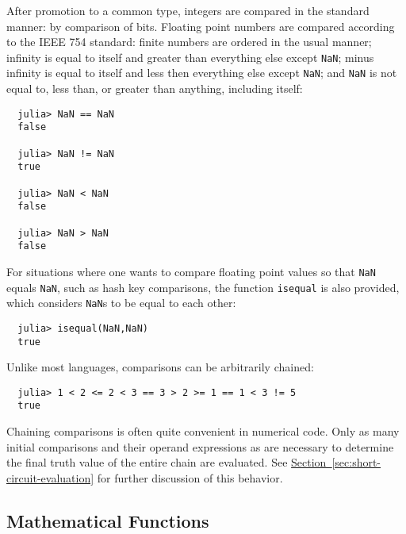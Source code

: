 \documentclass{article}
\newcommand{\Section}[1]{\hyperref[sec:#1]{Section~\ref*{sec:#1}}}
\begin{document}
After promotion to a common type, integers are compared in the standard manner:
by comparison of bits.
Floating point numbers are compared according to the IEEE 754 standard:
finite numbers are ordered in the usual manner;
infinity is equal to itself and greater than everything else except \verb|NaN|;
minus infinity is equal to itself and less then everything else except \verb|NaN|;
and \verb|NaN| is not equal to, less than, or greater than anything, including itself:
\begin{verbatim}
  julia> NaN == NaN
  false

  julia> NaN != NaN
  true

  julia> NaN < NaN
  false

  julia> NaN > NaN
  false
\end{verbatim}
For situations where one wants to compare floating point values so that \verb|NaN| equals \verb|NaN|, such as hash key comparisons, the function \verb|isequal| is also provided, which considers \verb|NaN|s to be equal to each other:
\begin{verbatim}
  julia> isequal(NaN,NaN)
  true
\end{verbatim}
Unlike most languages, comparisons can be arbitrarily chained:
\begin{verbatim}
  julia> 1 < 2 <= 2 < 3 == 3 > 2 >= 1 == 1 < 3 != 5
  true
\end{verbatim}
Chaining comparisons is often quite convenient in numerical code.
Only as many initial comparisons and their operand expressions as are necessary to determine the final truth value of the entire chain are evaluated.
See \Section{short-circuit-evaluation} for further discussion of this behavior.

\subsection{Mathematical Functions}
\end{document}
